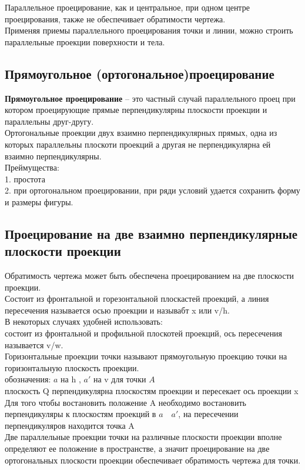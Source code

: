 \documentclass[a4paper, 12pt]{article}
\begin{document}
Параллельное проецирование, как и центральное, при одном центре проецирования, также не обеспечивает обратимости чертежа.\\
Применяя приемы параллельного проецирования точки и линии, можно строить параллельные проекции поверхности и тела.\\

\subsection{Прямоугольное (ортогональное)проецирование}

\textbf{Прямоугольное проецирование} -- это частный случай параллельного проец при котором проецирующие прямые перпендикулярны плоскости проекции и параллельны друг-другу.
\\
Ортогональные проекции двух взаимно перпендикулярных прямых, одна из которых параллельны плоскоти проекций а другая не перпендикулярна ей взаимно перпендикулярны.\\
Преймущества:\\
1. простота\\
2. при ортогональном проецировании, при ряди условий удается сохранить форму и размеры фигуры.\\

\subsection{Проецирование на две взаимно перпендикулярные плоскости проекции}
Обратимость чертежа может быть обеспечена проецированием на две плоскости проекции.\\

Состоит из фронтальной и горезонтальной плоскастей проекций, а линия пересечения называется осью проекции и называбт x или v/h.\\

В некоторых случаях удобней использовать:\\

состоит из фронтальной и профильной плоскотей проекций, ось пересечения называется v/w.\\

Горизонтальные проекции точки называют прямоугольную проекцию точки на горизонтальную плоскость проекции.\\

обозначения: $ a $ на h , $ a' $ на v для точки $ A $\\
плоскость Q перпендикулярна плоскостям проекции и пересекает ось проекции x\\
Для того чтобы востановить положение A необходимо востановить перпендикуляры к плоскостям проекций в $a \quad a'$, на пересечении перпендикуляров находится точка A\\
Две параллельные проекции точки на различные плоскости проекции вполне определяют ее положение в пространстве, а значит проецирование на две ортогональных плоскости проекции обеспечивает обратимость чертежа для точки.\\
\end{document}
